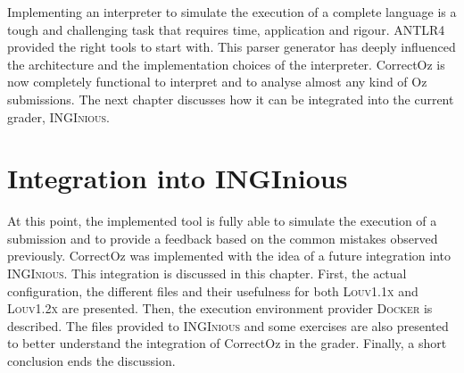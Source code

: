 \documentclass[11pt,a4paper,twoside,openright]{report}
\begin{document}
Implementing an interpreter to simulate the execution of a complete language is 
a tough and challenging task that requires time, application and rigour. 
\textsc{ANTLR4} provided the right tools to start with. This parser generator 
has deeply influenced the architecture and the implementation choices of the 
interpreter. CorrectOz is now completely functional to interpret and to analyse 
almost any kind of Oz submissions. The next chapter discusses how 
it can be integrated into the current grader, \textsc{INGInious}.



\chapter{Integration into INGInious} \label{chap:integration_ingi}
At this point, the implemented tool is fully able to simulate the execution of 
a submission and to provide a feedback based on the common mistakes observed 
previously. CorrectOz was implemented with the idea of a future integration 
into \textsc{INGInious}. This integration is discussed in this chapter. 
First, the actual configuration, the different files and 
their usefulness for both \textsc{Louv1.1x} and \textsc{Louv1.2x} are 
presented. Then, the execution environment provider \textsc{Docker} is 
described. The files provided to \textsc{INGInious} and some exercises 
are also presented to better understand the integration of CorrectOz in the 
grader. Finally, a short conclusion ends the discussion.
\end{document}

